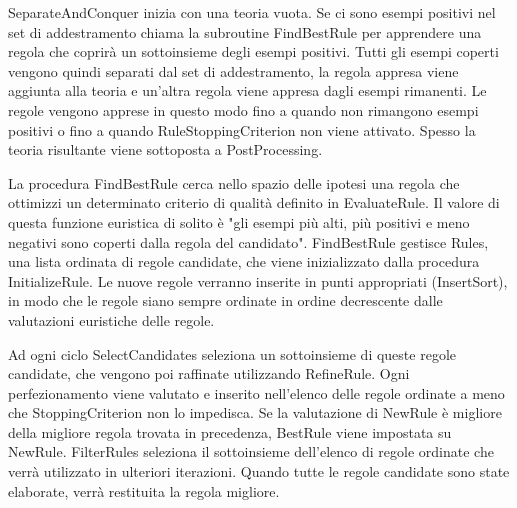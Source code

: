 \documentclass[a4paper]{extarticle}
\begin{document}
SeparateAndConquer inizia con una teoria vuota. Se ci sono esempi positivi nel set di addestramento chiama la subroutine FindBestRule per apprendere una regola che coprirà un sottoinsieme degli esempi positivi. Tutti gli esempi coperti vengono quindi separati dal set di addestramento, la regola appresa viene aggiunta alla teoria e un'altra regola viene appresa dagli esempi rimanenti. Le regole vengono apprese in questo modo fino a quando non rimangono esempi positivi o fino a quando RuleStoppingCriterion non viene attivato. Spesso la teoria risultante viene sottoposta a PostProcessing.

\begin{center}


\end{center}

La procedura FindBestRule cerca nello spazio delle ipotesi una regola che ottimizzi un determinato criterio di qualità definito in EvaluateRule. Il valore di questa funzione euristica di solito è "gli esempi più alti, più positivi e meno negativi sono coperti dalla regola del candidato". FindBestRule gestisce Rules, una lista ordinata di regole candidate, che viene inizializzato dalla procedura InitializeRule. Le nuove regole verranno inserite in punti appropriati (InsertSort), in modo che le regole siano sempre ordinate in ordine decrescente dalle valutazioni euristiche delle regole.

Ad ogni ciclo SelectCandidates seleziona un sottoinsieme di queste regole candidate, che vengono poi raffinate utilizzando RefineRule. Ogni perfezionamento viene valutato e inserito nell'elenco delle regole ordinate a meno che StoppingCriterion non lo impedisca. Se la valutazione di NewRule è migliore della migliore regola trovata in precedenza, BestRule viene impostata su NewRule. FilterRules seleziona il sottoinsieme dell'elenco di regole ordinate che verrà utilizzato in ulteriori iterazioni. Quando tutte le regole candidate sono state elaborate, verrà restituita la regola migliore.
\end{document}
